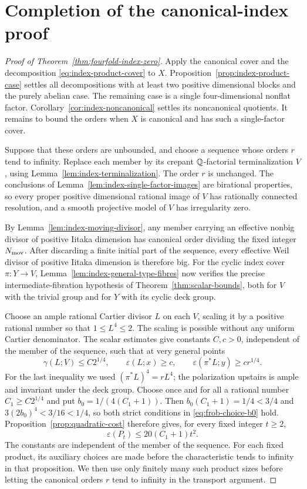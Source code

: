 \section{Completion of the canonical-index proof}\label{sec:index-zero}

\begin{proof}[Proof of Theorem~\ref{thm:fourfold-index-zero}]
Apply the canonical cover and the decomposition
\eqref{eq:index-product-cover} to \(X\).  Proposition~\ref{prop:index-product-case}
settles all decompositions with at least two positive dimensional
blocks and the purely abelian case.  The remaining case is a single
four-dimensional nonflat factor.  Corollary~\ref{cor:index-noncanonical}
settles its noncanonical quotients.  It remains to bound the orders
when \(X\) is canonical and has such a single-factor cover.

Suppose that these orders are unbounded, and choose a sequence whose
orders \(r\) tend to infinity.  Replace each member by its crepant
\(\mathbb Q\)-factorial terminalization \(V\), using
Lemma~\ref{lem:index-terminalization}.  The order \(r\) is unchanged.
The conclusions of Lemma~\ref{lem:index-single-factor-images} are
birational properties, so every proper positive dimensional rational
image of \(V\) has rationally connected resolution, and a smooth
projective model of \(V\) has irregularity zero.

By Lemma~\ref{lem:index-moving-divisor}, any member carrying an
effective nonbig divisor of positive Iitaka dimension has canonical
order dividing the fixed integer \(N_{\rm mov}\).  After discarding
a finite initial part of the sequence, every effective Weil divisor
of positive Iitaka dimension is therefore big.  For the cyclic
index cover \(\pi:Y\to V\), Lemma~\ref{lem:index-general-type-fibres}
now verifies the precise intermediate-fibration hypothesis of
Theorem~\ref{thm:scalar-bounds}, both for \(V\) with the trivial group
and for \(Y\) with its cyclic deck group.

Choose an ample rational Cartier divisor \(L\) on each \(V\), scaling
it by a positive rational number so that \(1\le L^4\le2\).
The scaling is possible without any uniform Cartier denominator.
The scalar estimates give constants \(C,c>0\), independent of the
member of the sequence, such that at very general points
\[
 \gamma(L;V)\le C2^{1/4},\qquad
 \varepsilon(L;x)\ge c,
 \qquad
 \varepsilon(\pi^*L;y)\ge c r^{1/4}.
\]
For the last inequality we used
\((\pi^*L)^4=rL^4\); the polarization upstairs is ample and invariant
under the deck group. Choose once and for all a rational number
$C_1\ge C2^{1/4}$ and put $b_0=1/(4(C_1+1))$.
Then $b_0(C_1+1)=1/4<3/4$ and
$3(2b_0)^4<3/16<1/4$, so both strict conditions in
\eqref{eq:frob-choice-b0} hold. Proposition~\ref{prop:quadratic-cost}
therefore gives, for every fixed integer $t\ge2$,
\[
 \varepsilon(P_t)\le 20(C_1+1)t^2.
\]
The constants are independent of the member of the sequence.
For each fixed product, its auxiliary choices are made before the
characteristic tends to infinity in that proposition. We then use
only finitely many such product sizes before letting the canonical
orders $r$ tend to infinity in the transport argument.


\end{proof}
